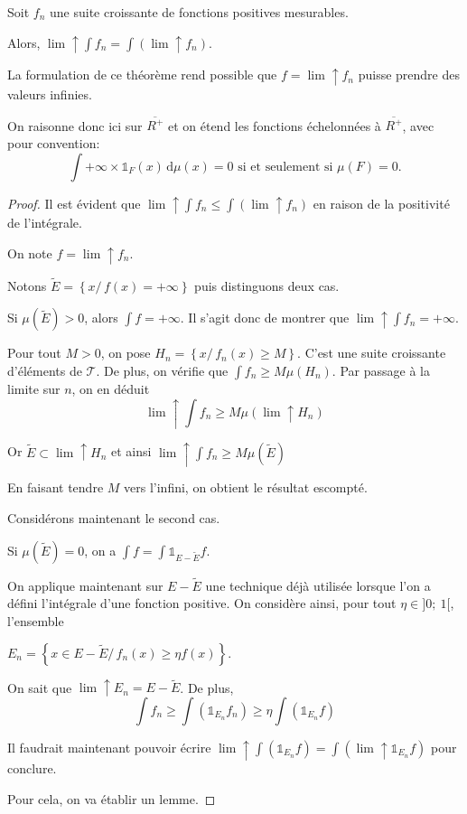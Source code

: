 \begin{theo}
Soit $f_n$ une suite croissante de fonctions positives mesurables.

Alors, $\lim \uparrow \displaystyle{\int} f_n =  \displaystyle{\int} \left(\lim \uparrow f_n\right)$.
\end{theo}

La formulation de ce théorème rend possible que $f =  \lim \uparrow f_n$ puisse prendre des valeurs infinies. 

On raisonne donc ici sur $\overline{R^{+}}$ et on étend les fonctions échelonnées à $\overline{R^{+}}$, avec pour convention:
\[
\displaystyle{\int} +\infty \times \mathbb{1}_F(x)  \, \mathrm d \mu(x) = 0 \text{ si et seulement si $\mu(F)=0$.}
\]

\begin{proof}
Il est évident que $\lim \uparrow \displaystyle{\int} f_n  \leq \displaystyle{\int} \left(\lim \uparrow f_n\right)$ en raison de la positivité de l'intégrale.

On note $f = \lim \uparrow f_n$.

Notons $\tilde{E} = \left \{ x/ \, f(x)=+\infty \right \}$ puis distinguons deux cas.

Si $\mu\left(\tilde{E}\right) > 0$, alors $\displaystyle{\int} f = +\infty$. Il s'agit donc de montrer que $\lim \uparrow \displaystyle{\int} f_n = +\infty$.

Pour tout $M > 0$, on pose $H_n = \left\{ x / \, f_n(x) \geq M \right \}$. C'est une suite croissante d'éléments de $\mathcal{T}$. De plus, on vérifie que 
$\displaystyle{\int} f_n \geq M \mu(H_n)$. Par passage à la limite sur $n$, on en déduit
\[
\lim \uparrow \displaystyle{\int} f_n \geq M \mu\left(\lim \uparrow H_n\right)
\]

Or $\tilde{E} \subset \lim \uparrow H_n$ et ainsi $\lim \uparrow \displaystyle{\int} f_n \geq M \mu\left(\tilde{E}\right)$

En faisant tendre $M$ vers l'infini, on obtient le résultat escompté.

Considérons maintenant le second cas. 

Si $\mu\left(\tilde{E}\right) = 0$, on a $\displaystyle{\int} f = \displaystyle{\int} \mathbb{1}_{E-\tilde{E}} f$.

On applique maintenant sur $E-\tilde{E}$ une technique déjà utilisée lorsque l'on a défini l'intégrale d'une fonction positive. On considère ainsi, pour tout $\eta \in ]0;~1[$, l'ensemble 

$E_n = \left\{ x \in E-\tilde{E}/ \, f_n(x) \geq \eta f(x) \right \}$.

On sait que $\lim \uparrow E_n = E - \tilde{E}$. De plus,
\[
\displaystyle{\int} f_n \geq \displaystyle{\int} \left(\mathbb{1}_{E_n} f_n\right) \geq \eta \displaystyle{\int} \left(\mathbb{1}_{E_n} f\right)
\]

Il faudrait maintenant pouvoir écrire $\lim \uparrow \displaystyle{\int} \left(\mathbb{1}_{E_n} f\right) = \displaystyle{\int} \left(\lim \uparrow \mathbb{1}_{E_n} f\right)$ pour conclure.

Pour cela, on va établir un lemme.
\end{proof}


